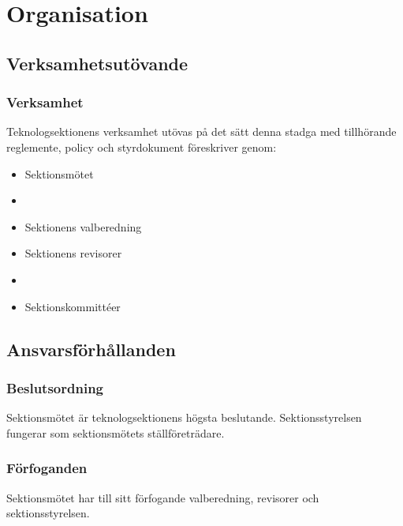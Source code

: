 \section{Organisation}

\subsection{Verksamhetsutövande}

\subsubsection{Verksamhet}

Teknologsektionens verksamhet utövas på det sätt denna stadga med tillhörande reglemente, policy och styrdokument föreskriver genom:

\begin{itemize}
	\item Sektionsmötet
	\item \STYRITFULL{}
	\item Sektionens valberedning
	\item Sektionens revisorer
	\item \SNITFULL{}
	\item Sektionskommittéer
\end{itemize}

\subsection{Ansvarsförhållanden}

\subsubsection{Beslutsordning}
Sektionsmötet är teknologsektionens högsta beslutande. Sektionsstyrelsen fungerar som sektionsmötets ställföreträdare.

\subsubsection{Förfoganden}
Sektionsmötet har till sitt förfogande valberedning, revisorer och sektionsstyrelsen.

